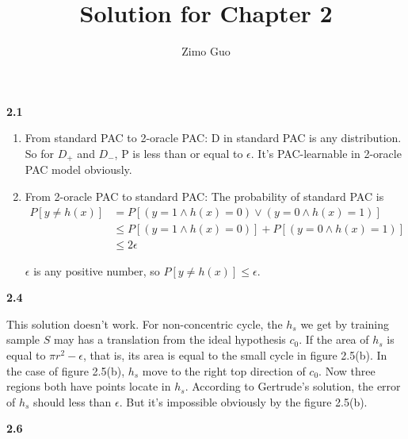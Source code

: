 \documentclass[12pt]{article}
\title{Solution for Chapter 2}
\author{Zimo Guo}
\date{}
\begin{document}
\maketitle

\noindent \textbf{2.1}

\begin{enumerate}[label=(\alph*), left=0pt] %
    \item 
    From standard PAC to 2-oracle PAC: D in standard PAC is any distribution. So for $D_{+}$ and 
    $D_{-}$, P is less than or equal to $\epsilon$. It's PAC-learnable in 2-oracle PAC model 
    obviously.

    \item 
    From 2-oracle PAC to standard PAC: The probability of standard PAC is
    \begin{align*}
        P[y \ne h(x)] &= P[(y = 1 \land h(x) = 0) \lor (y = 0 \land h(x) = 1)] \\
        &\le P[(y = 1 \land h(x) = 0)] + P[(y = 0 \land h(x) = 1)] \\
        &\le 2\epsilon
    \end{align*}

    $\epsilon$ is any positive number, so $P[y \ne h(x)] \le \epsilon$.
\end{enumerate}

\vspace{1em}  %

\noindent \textbf{2.4}

This solution doesn't work. For non-concentric cycle, the $h_{s}$ we get by training 
sample $S$ may has a translation from the ideal hypothesis $c_{0}$. If the area of 
$h_{s}$ is equal to $\pi r^2 - \epsilon$, that is, its area is equal to the small
cycle in figure 2.5(b). In the case of figure 2.5(b), $h_{s}$ move to the right top
direction of $c_{0}$. Now three regions both have points locate in $h_{s}$. According
to Gertrude's solution, the error of $h_{s}$ should less than $\epsilon$. But it's 
impossible obviously by the figure 2.5(b).


\vspace{1em}

\noindent \textbf{2.6}
\end{document}
